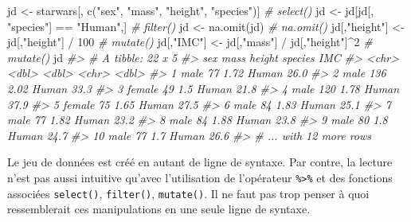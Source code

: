 \documentclass[
]{book}
\newenvironment{Shaded}{}{}
\newcommand{\CommentTok}[1]{\textit{#1}}
\newcommand{\DecValTok}[1]{#1}
\newcommand{\FunctionTok}[1]{#1}
\newcommand{\NormalTok}[1]{#1}
\newcommand{\OtherTok}[1]{#1}
\newcommand{\SpecialCharTok}[1]{#1}
\newcommand{\StringTok}[1]{#1}
\begin{document}
\begin{Shaded}
\begin{Highlighting}[]
\NormalTok{jd }\OtherTok{\textless{}{-}}\NormalTok{ starwars[, }\FunctionTok{c}\NormalTok{(}\StringTok{"sex"}\NormalTok{, }\StringTok{"mass"}\NormalTok{, }\StringTok{"height"}\NormalTok{, }\StringTok{"species"}\NormalTok{)]  }\CommentTok{\# select()}
\NormalTok{jd }\OtherTok{\textless{}{-}}\NormalTok{ jd[jd[, }\StringTok{"species"}\NormalTok{] }\SpecialCharTok{==} \StringTok{"Human"}\NormalTok{,]                    }\CommentTok{\# filter()}
\NormalTok{jd }\OtherTok{\textless{}{-}} \FunctionTok{na.omit}\NormalTok{(jd)                                        }\CommentTok{\# na.omit()}
\NormalTok{jd[,}\StringTok{"height"}\NormalTok{] }\OtherTok{\textless{}{-}}\NormalTok{ jd[,}\StringTok{"height"}\NormalTok{] }\SpecialCharTok{/} \DecValTok{100}                     \CommentTok{\# mutate()}
\NormalTok{jd[,}\StringTok{"IMC"}\NormalTok{] }\OtherTok{\textless{}{-}}\NormalTok{ jd[,}\StringTok{"mass"}\NormalTok{] }\SpecialCharTok{/}\NormalTok{ jd[,}\StringTok{"height"}\NormalTok{]}\SpecialCharTok{\^{}}\DecValTok{2}              \CommentTok{\# mutate()}
\NormalTok{jd}
\CommentTok{\#\textgreater{} \# A tibble: 22 x 5}
\CommentTok{\#\textgreater{}    sex     mass height species   IMC}
\CommentTok{\#\textgreater{}    \textless{}chr\textgreater{}  \textless{}dbl\textgreater{}  \textless{}dbl\textgreater{} \textless{}chr\textgreater{}   \textless{}dbl\textgreater{}}
\CommentTok{\#\textgreater{}  1 male      77   1.72 Human    26.0}
\CommentTok{\#\textgreater{}  2 male     136   2.02 Human    33.3}
\CommentTok{\#\textgreater{}  3 female    49   1.5  Human    21.8}
\CommentTok{\#\textgreater{}  4 male     120   1.78 Human    37.9}
\CommentTok{\#\textgreater{}  5 female    75   1.65 Human    27.5}
\CommentTok{\#\textgreater{}  6 male      84   1.83 Human    25.1}
\CommentTok{\#\textgreater{}  7 male      77   1.82 Human    23.2}
\CommentTok{\#\textgreater{}  8 male      84   1.88 Human    23.8}
\CommentTok{\#\textgreater{}  9 male      80   1.8  Human    24.7}
\CommentTok{\#\textgreater{} 10 male      77   1.7  Human    26.6}
\CommentTok{\#\textgreater{} \# ... with 12 more rows}
\end{Highlighting}
\end{Shaded}

Le jeu de données est créé en autant de ligne de syntaxe. Par contre, la lecture n'est pas aussi intuitive qu'avec l'utilisation de l'opérateur \texttt{\%\textgreater{}\%} et des fonctions associées \texttt{select()}, \texttt{filter()}, \texttt{mutate()}. Il ne faut pas trop penser à quoi ressemblerait ces manipulations en une seule ligne de syntaxe.
\end{document}
